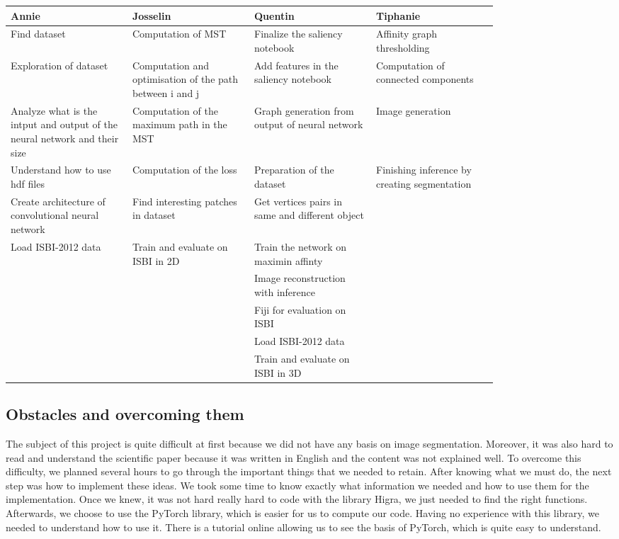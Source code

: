 \begin{center}
	\begin{tabular}{ |p{0.2\linewidth}|p{0.2\linewidth}|p{0.2\linewidth}|p{0.2\linewidth}| } 
 \hline
 Annie & Josselin & Quentin & Tiphanie \\
 \hline
 Find dataset & Computation of MST & Finalize the saliency notebook & Affinity graph thresholding \\ 
 \hline
 Exploration of dataset & Computation and optimisation of the path between i and j & Add features in the saliency notebook & Computation of connected components \\ 
 \hline
 Analyze what is the intput and output of the neural network and their size & Computation of the maximum path in the MST & Graph generation from output of neural network & Image generation \\ 
 \hline
 Understand how to use hdf files & Computation of the loss & Preparation of the dataset & Finishing inference by creating segmentation \\
 \hline
 Create architecture of convolutional neural network & Find interesting patches in dataset & Get vertices pairs in same and different object & \\
 \hline
 Load ISBI-2012 data & Train and evaluate on ISBI in 2D & Train the network on maximin affinty & \\
 \hline
  & & Image reconstruction with inference & \\
 \hline
  & & Fiji for evaluation on ISBI & \\
 \hline
  & & Load ISBI-2012 data & \\
 \hline
 & & Train and evaluate on ISBI in 3D & \\

 \hline
\end{tabular}
\end{center}


\subsection{Obstacles and overcoming them}

The subject of this project is quite difficult at first because we did not have
any basis on image segmentation. Moreover, it was also hard to read and
understand the scientific paper because it was written in English and the
content was not explained well. To overcome this difficulty, we planned several
hours to go through the important things that we needed to retain. After
knowing what we must do, the next step was how to implement these ideas. We
took some time to know exactly what information we needed and how to use them
for the implementation. Once we knew, it was not hard really hard to code with
the library Higra, we just needed to find the right functions. Afterwards, we
choose to use the PyTorch library, which is easier for us to compute our code.
Having no experience with this library, we needed to understand how to use it.
There is a tutorial online allowing us to see the basis of PyTorch, which is
quite easy to understand. \\

